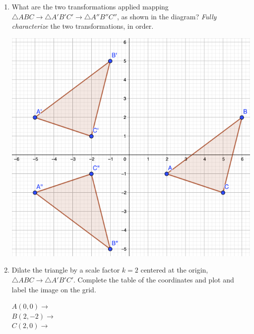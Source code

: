\documentclass[12pt, twoside]{article}
\begin{document}
\begin{enumerate}
\newpage
\item What are the two transformations applied mapping $\triangle ABC \rightarrow \triangle A'B'C' \rightarrow \triangle A''B''C''$, as shown in the diagram? \emph{Fully characterize} the two transformations, in order.
    \begin{flushright}
      \includegraphics[width=6in]{5-11_6_Translate+reflect.png}
    \end{flushright}

\newpage
\item Dilate the triangle by a scale factor $k=2$ centered at the origin, $\triangle ABC \rightarrow \triangle A'B'C'$. Complete the table of the coordinates and plot and label the image on the grid. \vspace{0.5cm}
\begin{multicols}{2}
  $A(0,0) \rightarrow$ \\[0.7cm]
  $B(2,-2) \rightarrow$ \\[0.7cm]
  $C(2,0) \rightarrow$ \\[0.7cm]
  \end{multicols}


\end{enumerate}
\end{document}
